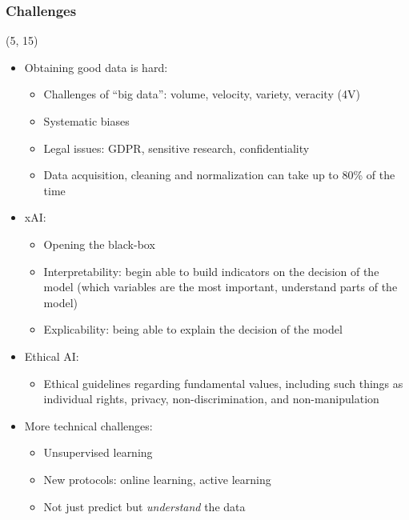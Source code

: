 \begin{frame}
  \frametitle{Challenges}

  \begin{textblock}{90}(5, 15)
    \begin{itemize}
    \item<1-> Obtaining good data is hard:
      \begin{itemize}
      \item Challenges of ``big data'': volume, velocity, variety, veracity (4V)
      \item Systematic biases
      \item Legal issues: GDPR, sensitive research, confidentiality
      \item Data acquisition, cleaning and normalization can take up to 80\% of
        the time
      \end{itemize}
    \item<2-> \acl{xAI}:
      \begin{itemize}
      \item Opening the black-box
      \item Interpretability: begin able to build indicators on the decision of the model
        (which variables are the most important, understand parts of the model)
      \item Explicability: being able to explain the decision of the model
      \end{itemize}
    \item<3-> Ethical \ac{AI}:
      \begin{itemize}
      \item Ethical guidelines regarding fundamental values, including such things as individual rights, privacy, non-discrimination, and non-manipulation
      \end{itemize}
    \item<4-> More technical challenges:
      \begin{itemize}
      \item Unsupervised learning
      \item New protocols: online learning, active learning
      \item Not just predict but \emph{understand} the data
      \end{itemize}
    \end{itemize}
  \end{textblock}
\end{frame}



